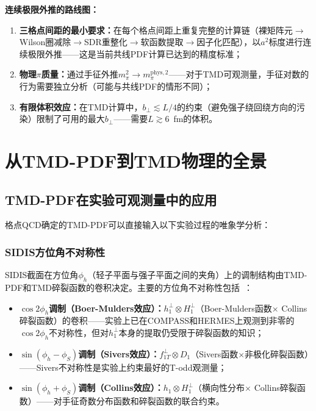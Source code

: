 \documentclass[12pt,a4paper]{ctexart}
\theoremstyle{definition}
\begin{document}
\textbf{连续极限外推的路线图：}
\begin{enumerate}
    \item \textbf{三格点间距的最小要求：}在每个格点间距上重复完整的计算链（裸矩阵元$\to$Wilson圈减除$\to$SDR重整化$\to$软函数提取$\to$因子化匹配），以$a^2$标度进行连续极限外推——这是当前共线PDF计算已达到的精度标准；
    \item \textbf{物理$\pi$质量：}通过手征外推$m_\pi^2 \to m_\pi^{\text{phys},2}$——对于TMD可观测量，手征对数的行为需要独立分析（可能与共线PDF的情形不同）；
    \item \textbf{有限体积效应：}在TMD计算中，$b_\perp \lesssim L/4$的约束（避免强子绕回绕方向的污染）限制了可用的最大$b_\perp$——需要$L \gtrsim 6$~fm的体积。
\end{enumerate}

\section{从TMD-PDF到TMD物理的全景}

\subsection{TMD-PDF在实验可观测量中的应用}

格点QCD确定的TMD-PDF可以直接输入以下实验过程的唯象学分析：

\subsubsection{SIDIS方位角不对称性}

SIDIS截面在方位角$\phi_h$（轻子平面与强子平面之间的夹角）上的调制结构由TMD-PDF和TMD碎裂函数的卷积决定。主要的方位角不对称性包括~\cite{Ma2025BoerMulders}：

\begin{itemize}
    \item \textbf{$\cos 2\phi_h$调制（Boer-Mulders效应）：}$h_1^\perp \otimes H_1^\perp$（Boer-Mulders函数$\times$ Collins碎裂函数）的卷积——实验上已在COMPASS和HERMES上观测到非零的$\cos 2\phi_h$不对称性，但对$h_1^\perp$本身的提取仍受限于碎裂函数的知识；
    \item \textbf{$\sin(\phi_h - \phi_S)$调制（Sivers效应）：}$f_{1T}^\perp \otimes D_1$（Sivers函数$\times$非极化碎裂函数）——Sivers不对称性是实验上约束最好的T-odd观测量；
    \item \textbf{$\sin(\phi_h + \phi_S)$调制（Collins效应）：}$h_1 \otimes H_1^\perp$（横向性分布$\times$ Collins碎裂函数）——对手征奇数分布函数和碎裂函数的联合约束。
\end{itemize}
\end{document}
